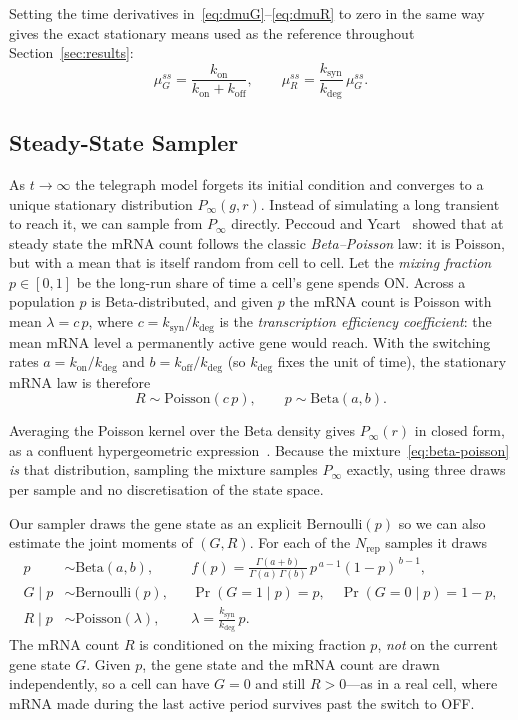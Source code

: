 \documentclass[11pt]{article}
\newcommand{\muG}{\mu_G}
\newcommand{\muR}{\mu_R}
\newcommand{\kon}{k_{\mathrm{on}}}
\newcommand{\koff}{k_{\mathrm{off}}}
\newcommand{\ksyn}{k_{\mathrm{syn}}}
\newcommand{\kdeg}{k_{\mathrm{deg}}}
\begin{document}
Setting the time derivatives in~\eqref{eq:dmuG}--\eqref{eq:dmuR} to zero in the same way gives the exact
stationary means used as the reference throughout Section~\ref{sec:results}:
\begin{equation}
\label{eq:ss-means}
  \muG^{ss} = \frac{\kon}{\kon+\koff},
  \qquad
  \muR^{ss} = \frac{\ksyn}{\kdeg}\,\muG^{ss}.
\end{equation}

\subsection{Steady-State Sampler}
\label{sec:ss}

As $t\to\infty$ the telegraph model forgets its initial condition and converges to a unique
stationary distribution $P_\infty(g,r)$. Instead of simulating a long transient to reach it, we can
sample from $P_\infty$ directly. Peccoud and Ycart~\cite{peccoud1995} showed that at steady state
the mRNA count follows the classic \emph{Beta--Poisson} law: it is Poisson, but with a mean that is
itself random from cell to cell. Let the \emph{mixing fraction} $p\in[0,1]$ be the long-run share of
time a cell's gene spends ON. Across a population $p$ is Beta-distributed, and given $p$ the mRNA
count is Poisson with mean $\lambda=c\,p$, where $c=\ksyn/\kdeg$ is the \emph{transcription
efficiency coefficient}: the mean mRNA level a permanently active gene would reach. With the
switching rates $a=\kon/\kdeg$ and $b=\koff/\kdeg$ (so $\kdeg$ fixes the unit of time),
the stationary mRNA law is therefore
\begin{equation}
\label{eq:beta-poisson}
  R \sim \mathrm{Poisson}(c\,p), \qquad p \sim \mathrm{Beta}(a,b).
\end{equation}

Averaging the Poisson kernel over the Beta density gives $P_\infty(r)$ in closed form, as a confluent
hypergeometric expression~\cite{peccoud1995}. Because the mixture~\eqref{eq:beta-poisson} \emph{is}
that distribution, sampling the mixture samples $P_\infty$ exactly, using three draws per sample and
no discretisation of the state space.

Our sampler draws the gene state as an explicit
$\mathrm{Bernoulli}(p)$ so we can also estimate the joint moments of $(G,R)$. For each of the
$N_{\mathrm{rep}}$ samples it draws
\begin{align}
  p &\sim \mathrm{Beta}(a,b),
  &&f(p) = \frac{\Gamma(a+b)}{\Gamma(a)\,\Gamma(b)}\,p^{\,a-1}(1-p)^{\,b-1}, \\[2pt]
  G \mid p &\sim \mathrm{Bernoulli}(p),
  &&\Pr(G=1\mid p)=p,\quad \Pr(G=0\mid p)=1-p, \\[2pt]
  R \mid p &\sim \mathrm{Poisson}(\lambda),
  &&\lambda = \frac{\ksyn}{\kdeg}\,p .
\end{align}
The mRNA count $R$ is conditioned on the mixing fraction $p$, \emph{not} on
the current gene state $G$. Given $p$, the gene state and the mRNA count are drawn independently, so
a cell can have $G=0$ and still $R>0$---as in a real cell, where mRNA made during the last active
period survives past the switch to OFF.
\end{document}

